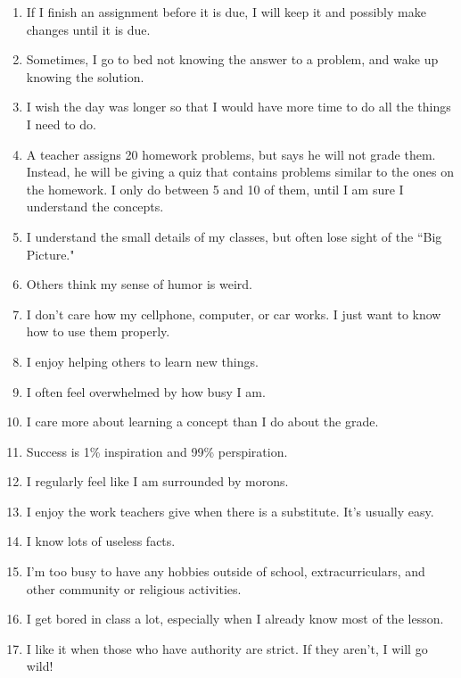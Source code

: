\documentclass[letterpaper, 12pt]{article}
\begin{document}
\begin{enumerate}
    \item [\rule{0.3in}{0.01in} 14.]If I finish an assignment before it is due, I will keep it and possibly make changes until it is due.
    \item [\rule{0.3in}{0.01in} 15.]Sometimes, I go to bed not knowing the answer to a problem, and wake up knowing the solution.
    \item [\rule{0.3in}{0.01in} 16.]I wish the day was longer so that I would have more time to do all the things I need to do.
    \item [\rule{0.3in}{0.01in} 17.]A teacher assigns 20 homework problems, but says he will not grade them.  Instead, he will be giving a quiz that contains problems similar to the ones on the homework.  I only do between 5 and 10 of them, until I am sure I understand the concepts.
    \item [\rule{0.3in}{0.01in} 18.]I understand the small details of my classes, but often lose sight of the ``Big Picture."
    \item [\rule{0.3in}{0.01in} 19.]Others think my sense of humor is weird.
    \item [\rule{0.3in}{0.01in} 20.]I don't care how my cellphone, computer, or car works. I just want to know how to use them properly.
    \item [\rule{0.3in}{0.01in} 21.]I enjoy helping others to learn new things. 
    \item [\rule{0.3in}{0.01in} 22.]I often feel overwhelmed by how busy I am.
    \item [\rule{0.3in}{0.01in} 23.]I care more about learning a concept than I do about the grade.
    \item [\rule{0.3in}{0.01in} 24.]Success is 1\% inspiration and 99\% perspiration.
    \item [\rule{0.3in}{0.01in} 25.]I regularly feel like I am surrounded by morons.
    \item [\rule{0.3in}{0.01in} 26.]I enjoy the work teachers give when there is a substitute.  It's usually easy.
    \item [\rule{0.3in}{0.01in} 27.]I know lots of useless facts.
    \item [\rule{0.3in}{0.01in} 28.]I'm too busy to have any hobbies outside of school, extracurriculars, and other community or religious activities.
    \item [\rule{0.3in}{0.01in} 29.]I get bored in class a lot, especially when I already know most of the lesson.  
    \item [\rule{0.3in}{0.01in} 30.]I like it when those who have authority are strict.  If they aren't, I will go wild!
    
 	
\end{enumerate}
\end{document}
